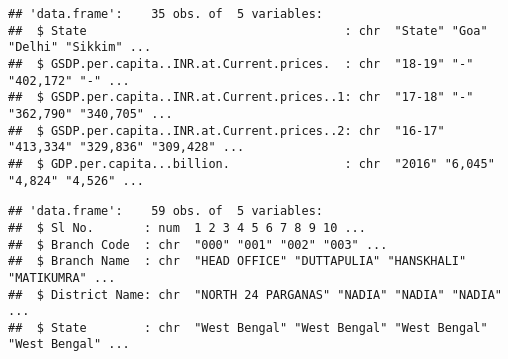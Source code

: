\documentclass[]{article}
\newenvironment{Shaded}{\begin{snugshade}}{\end{snugshade}}
\newcommand{\KeywordTok}[1]{\textcolor[rgb]{0.13,0.29,0.53}{\textbf{#1}}}
\newcommand{\DataTypeTok}[1]{\textcolor[rgb]{0.13,0.29,0.53}{#1}}
\newcommand{\DecValTok}[1]{\textcolor[rgb]{0.00,0.00,0.81}{#1}}
\newcommand{\CharTok}[1]{\textcolor[rgb]{0.31,0.60,0.02}{#1}}
\newcommand{\StringTok}[1]{\textcolor[rgb]{0.31,0.60,0.02}{#1}}
\newcommand{\CommentTok}[1]{\textcolor[rgb]{0.56,0.35,0.01}{\textit{#1}}}
\newcommand{\OperatorTok}[1]{\textcolor[rgb]{0.81,0.36,0.00}{\textbf{#1}}}
\newcommand{\NormalTok}[1]{#1}
\begin{document}
\begin{verbatim}
## 'data.frame':    35 obs. of  5 variables:
##  $ State                                    : chr  "State" "Goa" "Delhi" "Sikkim" ...
##  $ GSDP.per.capita..INR.at.Current.prices.  : chr  "18-19" "-" "402,172" "-" ...
##  $ GSDP.per.capita..INR.at.Current.prices..1: chr  "17-18" "-" "362,790" "340,705" ...
##  $ GSDP.per.capita..INR.at.Current.prices..2: chr  "16-17" "413,334" "329,836" "309,428" ...
##  $ GDP.per.capita...billion.                : chr  "2016" "6,045" "4,824" "4,526" ...
\end{verbatim}

\begin{Shaded}
\end{Shaded}

\begin{verbatim}
## 'data.frame':    59 obs. of  5 variables:
##  $ Sl No.       : num  1 2 3 4 5 6 7 8 9 10 ...
##  $ Branch Code  : chr  "000" "001" "002" "003" ...
##  $ Branch Name  : chr  "HEAD OFFICE" "DUTTAPULIA" "HANSKHALI" "MATIKUMRA" ...
##  $ District Name: chr  "NORTH 24 PARGANAS" "NADIA" "NADIA" "NADIA" ...
##  $ State        : chr  "West Bengal" "West Bengal" "West Bengal" "West Bengal" ...
\end{verbatim}
\end{document}
